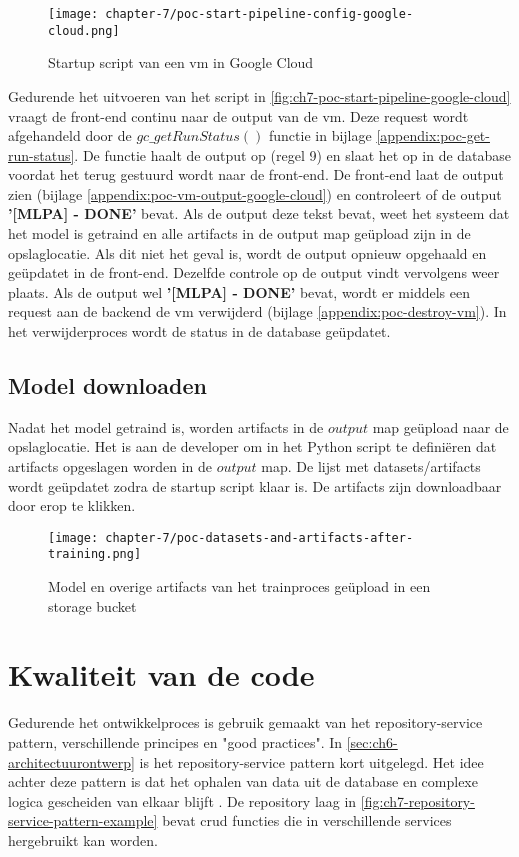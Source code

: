 \begin{figure}[hbt!]
  \centering
  \texttt{[image: chapter-7/poc-start-pipeline-config-google-cloud.png]}
  \caption{Startup script van een \acrfull{vm} in Google Cloud}
  \label{fig:ch7-poc-start-pipeline-config-google-cloud}
\end{figure}

Gedurende het uitvoeren van het script in \autoref{fig:ch7-poc-start-pipeline-google-cloud} vraagt de front-end continu naar de output van de \acrshort{vm}. Deze request wordt afgehandeld door de \(gc\_getRunStatus()\) functie in bijlage \ref{appendix:poc-get-run-status}. De functie haalt de output op (regel 9) en slaat het op in de database voordat het terug gestuurd wordt naar de front-end. De front-end laat de output zien (bijlage \ref{appendix:poc-vm-output-google-cloud}) en controleert of de output \textbf{'[MLPA] - DONE'} bevat. Als de output deze tekst bevat, weet het systeem dat het model is getraind en alle \glspl{artifact} in de output map geüpload zijn in de opslaglocatie. Als dit niet het geval is, wordt de output opnieuw opgehaald en geüpdatet in de front-end. Dezelfde controle op de output vindt vervolgens weer plaats. Als de output wel \textbf{'[MLPA] - DONE'} bevat, wordt er middels een request aan de backend de \acrshort{vm} verwijderd (bijlage \ref{appendix:poc-destroy-vm}). In het verwijderproces wordt de status in de database geüpdatet.

\subsection{Model downloaden}\label{subsec:ch7-model-downloaden}
Nadat het model getraind is, worden \glspl{artifact} in de \(output\) map geüpload naar de opslaglocatie. Het is aan de developer om in het Python script te definiëren dat artifacts opgeslagen worden in de \(output\) map. De lijst met datasets/\glspl{artifact} wordt geüpdatet zodra de startup script klaar is. De \glspl{artifact} zijn downloadbaar door erop te klikken.

\begin{figure}[hbt!]
  \centering
  \texttt{[image: chapter-7/poc-datasets-and-artifacts-after-training.png]}
  \caption{Model en overige \glspl{artifact} van het trainproces geüpload in een storage bucket}
  \label{fig:ch7-poc-datasets-and-artifacts-after-training}
\end{figure}

\section{Kwaliteit van de code}\label{sec:ch7-kwaliteit-van-de-code}
Gedurende het ontwikkelproces is gebruik gemaakt van het repository-service pattern, verschillende principes en "good practices". In \autoref{sec:ch6-architectuurontwerp} is het repository-service pattern kort uitgelegd. Het idee achter deze pattern is dat het ophalen van data uit de database en complexe logica gescheiden van elkaar blijft \cite{repository-service-pattern}. De repository laag in \autoref{fig:ch7-repository-service-pattern-example} bevat \acrfull{crud} functies die in verschillende services hergebruikt kan worden. 

